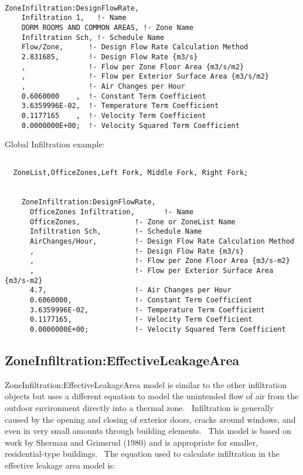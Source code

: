 \begin{lstlisting}

ZoneInfiltration:DesignFlowRate,
    Infiltration 1,   !- Name
    DORM ROOMS AND COMMON AREAS, !- Zone Name
    Infiltration Sch, !- Schedule Name
    Flow/Zone,      !- Design Flow Rate Calculation Method
    2.831685,       !- Design Flow Rate {m3/s}
    ,               !- Flow per Zone Floor Area {m3/s/m2}
    ,               !- Flow per Exterior Surface Area {m3/s/m2}
    ,               !- Air Changes per Hour
    0.6060000    ,  !- Constant Term Coefficient
    3.6359996E-02,  !- Temperature Term Coefficient
    0.1177165    ,  !- Velocity Term Coefficient
    0.0000000E+00;  !- Velocity Squared Term Coefficient
\end{lstlisting}

Global Infiltration example:

\begin{lstlisting}

  ZoneList,OfficeZones,Left Fork, Middle Fork, Right Fork;


    ZoneInfiltration:DesignFlowRate,
      OfficeZones Infiltration,       !- Name
      OfficeZones,             !- Zone or ZoneList Name
      Infiltration Sch,        !- Schedule Name
      AirChanges/Hour,         !- Design Flow Rate Calculation Method
      ,                        !- Design Flow Rate {m3/s}
      ,                        !- Flow per Zone Floor Area {m3/s-m2}
      ,                        !- Flow per Exterior Surface Area {m3/s-m2}
      4.7,                     !- Air Changes per Hour
      0.6060000,               !- Constant Term Coefficient
      3.6359996E-02,           !- Temperature Term Coefficient
      0.1177165,               !- Velocity Term Coefficient
      0.0000000E+00;           !- Velocity Squared Term Coefficient
\end{lstlisting}

\subsection{ZoneInfiltration:EffectiveLeakageArea}\label{zoneinfiltrationeffectiveleakagearea}

ZoneInfiltration:EffectiveLeakageArea model is similar to the other infiltration objects but uses a different equation to model the unintended flow of air from the outdoor environment directly into a thermal zone.~ Infiltration is generally caused by the opening and closing of exterior doors, cracks around windows, and even in very small amounts through building elements.~ This model is based on work by Sherman and Grimsrud (1980) and is appropriate for smaller, residential-type buildings.~ The equation used to calculate infiltration in the effective leakage area model is:

